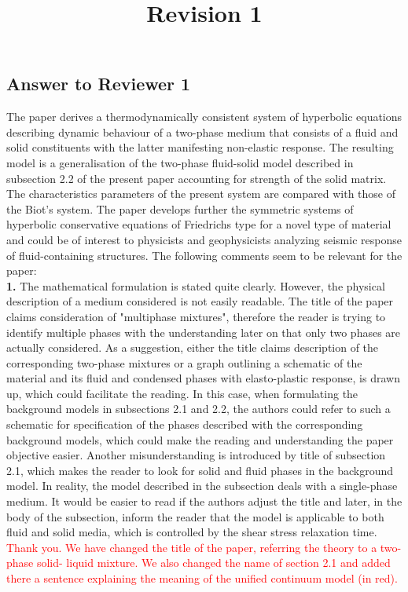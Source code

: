 \documentclass[3p,times,table]{article}
\title{\bf Revision 1}
\date{}
\newcommand{\revOne}[1]{\textcolor{Red}{#1}}
\begin{document}
 
\maketitle


\subsection*{Answer to Reviewer 1}
The paper derives a thermodynamically consistent system of hyperbolic equations describing dynamic 
behaviour of a two-phase medium that consists of a fluid and solid constituents with the latter 
manifesting non-elastic response. The resulting model is a generalisation of the two-phase 
fluid-solid model described in subsection 2.2 of the present paper accounting for strength of the 
solid matrix. The characteristics parameters of the present system are compared with those of the 
Biot's system. The paper develops further the symmetric systems of hyperbolic conservative 
equations of Friedrichs type for a novel type of material and could be of interest to physicists 
and geophysicists analyzing seismic response of fluid-containing structures. The following comments 
seem to be relevant for the paper:
\\

\textbf{1.}      The mathematical formulation is stated quite clearly. However, the physical 
description of 
a medium considered is not easily readable. The title of the paper claims consideration of 
"multiphase mixtures", therefore the reader is trying to identify multiple phases with the 
understanding later on that only two phases are actually considered. As a suggestion, either the 
title claims description of the corresponding two-phase mixtures or a graph outlining a schematic 
of the material and its fluid and condensed phases with elasto-plastic response, is drawn up, which 
could facilitate the reading. In this case, when formulating the background models in subsections 
2.1 and 2.2, the authors could refer to such a schematic for specification of the phases described 
with the corresponding background models, which could make the reading and understanding the paper 
objective easier. Another misunderstanding is introduced by title of subsection 2.1, which makes 
the reader to look for
solid and fluid phases in the background model. In reality, the model described in the subsection 
deals with a single-phase medium. It would be easier to read if the authors adjust the title and 
later, in the body of the subsection, inform the reader that the model is applicable to both fluid 
and solid media, which is controlled by the shear stress relaxation 
time.
\\
\revOne{Thank you. We have changed the title of the paper, referring 
the theory to a two-phase solid- liquid mixture.
	We also changed the name of section 2.1 and added there a 
	sentence 
	explaining the meaning of the unified continuum model (in red).
}
\\
\end{document}
